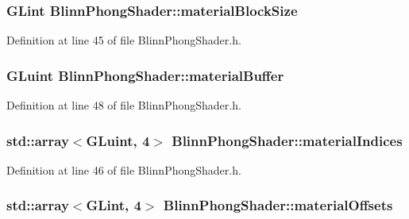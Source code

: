 \subsubsection[{material\+Block\+Size}]{\setlength{\rightskip}{0pt plus 5cm}G\+Lint Blinn\+Phong\+Shader\+::material\+Block\+Size\hspace{0.3cm}{\ttfamily [protected]}}\label{class_blinn_phong_shader_af38b3d042773f6568f0f6c227de85990}


Definition at line 45 of file Blinn\+Phong\+Shader.\+h.

\hypertarget{class_blinn_phong_shader_a85dbf4a8376a98570a06d9df17938cf4}{}
\subsubsection[{material\+Buffer}]{\setlength{\rightskip}{0pt plus 5cm}G\+Luint Blinn\+Phong\+Shader\+::material\+Buffer\hspace{0.3cm}{\ttfamily [protected]}}\label{class_blinn_phong_shader_a85dbf4a8376a98570a06d9df17938cf4}


Definition at line 48 of file Blinn\+Phong\+Shader.\+h.

\hypertarget{class_blinn_phong_shader_a2b14622a5d0f8ca32c05cc387700692a}{}
\subsubsection[{material\+Indices}]{\setlength{\rightskip}{0pt plus 5cm}std\+::array$<$G\+Luint, 4$>$ Blinn\+Phong\+Shader\+::material\+Indices\hspace{0.3cm}{\ttfamily [protected]}}\label{class_blinn_phong_shader_a2b14622a5d0f8ca32c05cc387700692a}


Definition at line 46 of file Blinn\+Phong\+Shader.\+h.

\hypertarget{class_blinn_phong_shader_a145f22608d6e32a4ec5df39388ad0530}{}
\subsubsection[{material\+Offsets}]{\setlength{\rightskip}{0pt plus 5cm}std\+::array$<$G\+Lint, 4$>$ Blinn\+Phong\+Shader\+::material\+Offsets\hspace{0.3cm}{\ttfamily [protected]}}\label{class_blinn_phong_shader_a145f22608d6e32a4ec5df39388ad0530}


